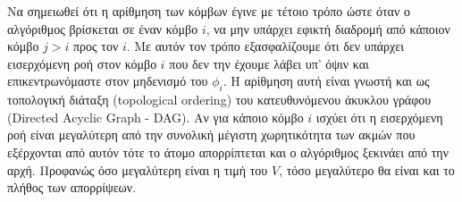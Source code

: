 \documentclass[a4paper,12pt]{article}
\begin{document}
Να σημειωθεί ότι η αρίθμηση των κόμβων έγινε με τέτοιο τρόπο ώστε όταν ο αλγόριθμος βρίσκεται σε έναν κόμβο $i$, 
να μην υπάρχει εφικτή διαδρομή από κάποιον κόμβο $j > i$ προς τον $i$. Με αυτόν τον τρόπο εξασφαλίζουμε ότι δεν 
υπάρχει εισερχόμενη ροή στον κόμβο $i$ που δεν την έχουμε λάβει υπ' όψιν και επικεντρωνόμαστε στον μηδενισμό του 
$\phi_i$. Η αρίθμηση αυτή είναι γνωστή και ως τοπολογική διάταξη (topological
ordering) του κατευθυνόμενου άκυκλου γράφου
(Directed Acyclic Graph - DAG). Αν για κάποιο κόμβο $i$ ισχύει ότι η εισερχόμενη ροή είναι 
μεγαλύτερη από την συνολική μέγιστη χωρητικότητα των ακμών που εξέρχονται από αυτόν τότε το άτομο απορρίπτεται 
και ο αλγόριθμος ξεκινάει από την αρχή. Προφανώς όσο μεγαλύτερη είναι η τιμή του $V$, τόσο μεγαλύτερο θα είναι 
και το πλήθος των απορρίψεων.
\end{document}
